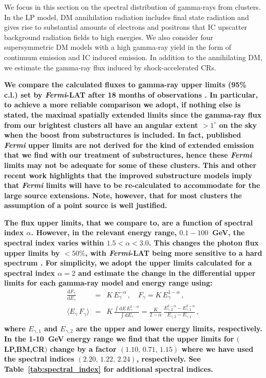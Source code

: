 \documentclass[10pt,aps,pra,reprint,amsmath,amsfonts,amssymb,showpacs,nofootinbib,floatfix]{revtex4-1}
\def\C#1{{\bf #1}}
\newcommand{\Fermi}{{\em Fermi}\xspace}
\newcommand{\rmn}{\mathrm}
\newcommand{\bra}{\langle}
\newcommand{\ket}{\rangle}
\newcommand{\dd}{\rmn{d}}
\newcommand{\eg}{E_\gamma}
\begin{document}
We focus in this section on the spectral distribution of gamma-rays
from clusters. In the LP model, DM annihilation radiation includes
final state radiation and gives rise to substantial amounts of
electrons and positrons that IC upscatter background radiation fields
to high energies. We also consider four supersymmetric DM models with
a high gamma-ray yield in the form of continuum emission and IC
induced emission. In addition to the annihilating DM, we estimate the
gamma-ray flux induced by shock-accelerated CRs.

\C{We compare the calculated fluxes to gamma-ray upper limits (95\%
  c.l.) set by \Fermi-LAT after 18 months of observations
  \cite{2010ApJ...717L..71A}. In particular, to achieve a more
  reliable comparison we adopt, if nothing else is stated, the maximal
  spatially extended limits since the gamma-ray flux from our
  brightest clusters all have an angular extent $>1^\circ$ on the
  sky when the boost from substructures is included. In fact, published
  \Fermi  upper limits are not derived for the kind of extended
  emission that we find with our treatment of substructures, hence these
  \Fermi limits may not be adequate for some of these clusters. This
  and other recent work highlights that the improved substructure
  models imply that \Fermi limits will have to be re-calculated to
  accommodate for the large source extensions. Note, however, that for
  most clusters the assumption of a point source is well justified.}

\C{The flux upper limits, that we compare to, are a function of spectral index
  $\alpha$. However, in the relevant energy range, $0.1-100$~GeV, the spectral
  index varies within $1.5 < \alpha < 3.0$. This changes the photon flux upper
  limits by $<50\%$, with \Fermi-LAT being more sensitive to a hard
  spectrum \cite{2010ApJ...717L..71A}. For simplicity, we adopt the upper limits
  calculated for a spectral index $\alpha=2$ and estimate the change in the
  differential upper limits for each gamma-ray model and energy range using:
\begin{eqnarray}
\frac{\dd F_\gamma}{\dd \eg} &=& K\,\eg^{-\alpha}\,,\quad F_\gamma = 
K\,\eg^{1-\alpha}\,,\nonumber\\
\bra\eg \,F_\gamma\ket &=& K\,
\frac{\displaystyle\int \dd E\, \eg^{1-\alpha}}{\displaystyle\int \dd \eg}
= \frac{K}{2-\alpha}\,
\frac{E_{\gamma,2}^{2-\alpha}-E_{\gamma,1}^{2-\alpha}}{E_{\gamma,2}-E_{\gamma,1}}\,,\nonumber\\
\label{eq:spec_ind_UL}
\end{eqnarray}
where $E_{\gamma,1}$ and $E_{\gamma,2}$ are the upper and lower energy
limits, respectively. In the 1-10~GeV energy range we find that the
upper limits for $($LP,BM,CR$)$ change by a factor
$(1.10,\,0.71,\,1.15)$ where we have used the spectral indices
$(2.20,\,1.22,\,2.24)$, respectively. See
Table~\ref{tab:spectral_index} for additional spectral indices.}
\end{document}

